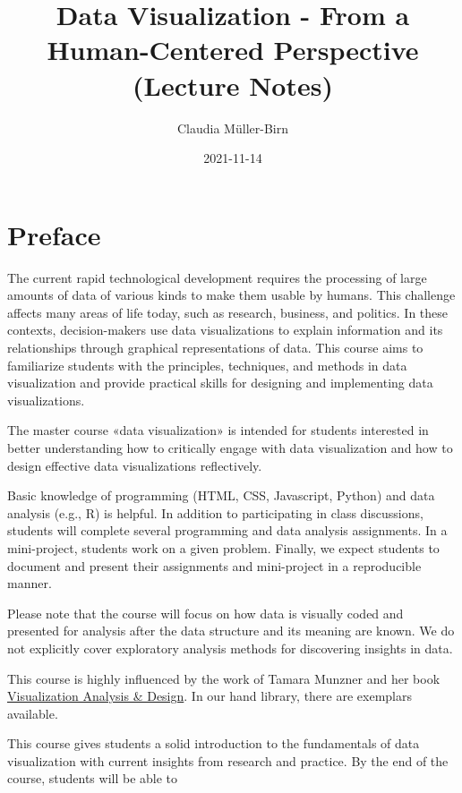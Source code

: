 \documentclass[
]{book}
\title{Data Visualization - From a Human-Centered Perspective (Lecture Notes)}
\author{Claudia Müller-Birn}
\date{2021-11-14}
\begin{document}
\maketitle

{
\setcounter{tocdepth}{2}
\tableofcontents
}
\hypertarget{preface}{%
\chapter*{Preface}\label{preface}}


The current rapid technological development requires the processing of large amounts of data of various kinds to make them usable by humans. This challenge affects many areas of life today, such as research, business, and politics. In these contexts, decision-makers use data visualizations to explain information and its relationships through graphical representations of data. This course aims to familiarize students with the principles, techniques, and methods in data visualization and provide practical skills for designing and implementing data visualizations.

The master course «data visualization» is intended for students interested in better understanding how to critically engage with data visualization and how to design effective data visualizations reflectively.

Basic knowledge of programming (HTML, CSS, Javascript, Python) and data analysis (e.g., R) is helpful. In addition to participating in class discussions, students will complete several programming and data analysis assignments. In a mini-project, students work on a given problem. Finally, we expect students to document and present their assignments and mini-project in a reproducible manner.

Please note that the course will focus on how data is visually coded and presented for analysis after the data structure and its meaning are known. We do not explicitly cover exploratory analysis methods for discovering insights in data.

This course is highly influenced by the work of Tamara Munzner and her book \href{https://www.routledge.com/Visualization-Analysis-and-Design/Munzner/p/book/9781466508910}{Visualization Analysis \& Design}. In our hand library, there are exemplars available.

This course gives students a solid introduction to the fundamentals of data visualization with current insights from research and practice. By the end of the course, students will be able to
\end{document}
